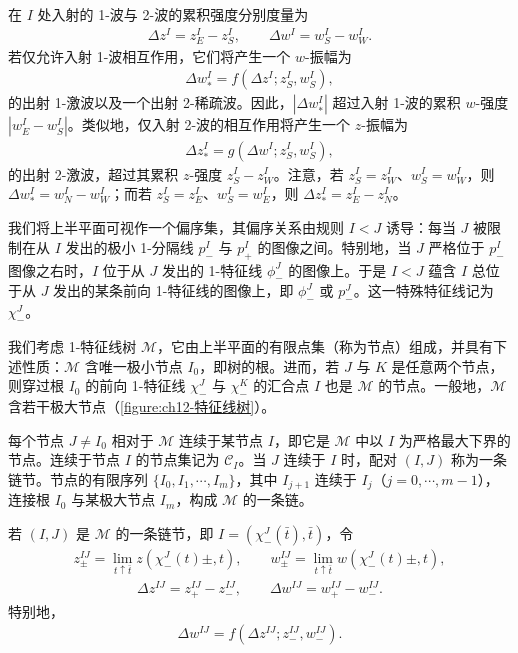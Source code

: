 \documentclass[../../main.tex]{subfiles}
\begin{document}
在 $I$ 处入射的 1-波与 2-波的累积强度分别度量为
\begin{align}
\Delta z^I=z_E^I-z_S^I,\qquad \Delta w^I=w_S^I-w_W^I.
\label{align:ch12-入射波}
\end{align}
若仅允许入射 1-波相互作用，它们将产生一个 $w$-振幅为
\begin{align}
\Delta w_*^I=f(\Delta z^I;z_S^I,w_S^I),
\label{align:ch12-出波w}
\end{align}
的出射 1-激波以及一个出射 2-稀疏波。因此，$|\Delta w_*^I|$ 超过入射 1-波的累积 $w$-强度 $|w_E^I-w_S^I|$。类似地，仅入射 2-波的相互作用将产生一个 $z$-振幅为
\begin{align}
\Delta z_*^I=g(\Delta w^I;z_S^I,w_S^I),
\label{align:ch12-出波z}
\end{align}
的出射 2-激波，超过其累积 $z$-强度 $z_S^I-z_W^I$。注意，若 $z_S^I=z_W^I$、$w_S^I=w_W^I$，则 $\Delta w_*^I=w_N^I-w_W^I$；而若 $z_S^I=z_E^I$、$w_S^I=w_E^I$，则 $\Delta z_*^I=z_E^I-z_N^I$。

我们将上半平面可视作一个偏序集，其偏序关系由规则 $I<J$ 诱导：每当 $J$ 被限制在从 $I$ 发出的极小 1-分隔线 $p_-^I$ 与 $p_+^I$ 的图像之间。特别地，当 $J$ 严格位于 $p_-^I$ 图像之右时，$I$ 位于从 $J$ 发出的 1-特征线 $\phi_-^J$ 的图像上。于是 $I<J$ 蕴含 $I$ 总位于从 $J$ 发出的某条前向 1-特征线的图像上，即 $\phi_-^J$ 或 $p_-^J$。这一特殊特征线记为 $\chi_-^J$。

我们考虑 1-特征线树 $\mathscr{M}$，它由上半平面的有限点集（称为节点）组成，并具有下述性质：$\mathscr{M}$ 含唯一极小节点 $I_0$，即树的根。进而，若 $J$ 与 $K$ 是任意两个节点，则穿过根 $I_0$ 的前向 1-特征线 $\chi_-^J$ 与 $\chi_-^K$ 的汇合点 $I$ 也是 $\mathscr{M}$ 的节点。一般地，$\mathscr{M}$ 含若干极大节点（\cref{figure:ch12-特征线树}）。

每个节点 $J\neq I_0$ 相对于 $\mathscr{M}$ 连续于某节点 $I$，即它是 $\mathscr{M}$ 中以 $I$ 为严格最大下界的节点。连续于节点 $I$ 的节点集记为 $\mathscr{C}_I$。当 $J$ 连续于 $I$ 时，配对 $(I,J)$ 称为一条链节。节点的有限序列 $\{I_0,I_1,\cdots,I_m\}$，其中 $I_{j+1}$ 连续于 $I_j$（$j=0,\cdots,m-1$），连接根 $I_0$ 与某极大节点 $I_m$，构成 $\mathscr{M}$ 的一条链。

若 $(I,J)$ 是 $\mathscr{M}$ 的一条链节，即 $I=(\chi_-^J(\bar t),\bar t)$，令
\begin{align}
z_\pm^{IJ}=\lim_{t\uparrow\bar t}z(\chi_-^J(t)\pm,t),\qquad
w_\pm^{IJ}=\lim_{t\uparrow\bar t}w(\chi_-^J(t)\pm,t),
\label{align:ch12-链节极限}
\end{align}
\begin{align}
\Delta z^{IJ}=z_+^{IJ}-z_-^{IJ},\qquad
\Delta w^{IJ}=w_+^{IJ}-w_-^{IJ}.
\label{align:ch12-链节跳跃}
\end{align}
特别地，
\begin{align}
\Delta w^{IJ}=f(\Delta z^{IJ};z_-^{IJ},w_-^{IJ}).
\label{align:ch12-链节f}
\end{align}
\end{document}
